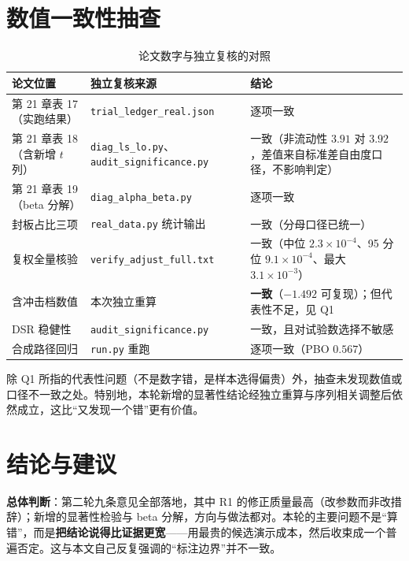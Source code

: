 \documentclass[11pt,a4paper]{ctexart}
\begin{document}
\section{数值一致性抽查}

\begin{table}[htbp]
\centering
\caption{论文数字与独立复核的对照}
\label{tab:consistency}
\begin{tabular}{@{}>{\raggedright\arraybackslash}p{4.6cm}>{\raggedright\arraybackslash}p{4.4cm}>{\raggedright\arraybackslash}p{4.6cm}@{}}
\toprule
论文位置 & 独立复核来源 & 结论 \\
\midrule
第 21 章表 17（实跑结果） & \texttt{trial\_ledger\_real.json} & 逐项一致 \\
第 21 章表 18（含新增 $t$ 列） & \texttt{diag\_ls\_lo.py}、\texttt{audit\_significance.py} & 一致（非流动性 $3.91$ 对 $3.92$，差值来自标准差自由度口径，不影响判定） \\
第 21 章表 19（beta 分解） & \texttt{diag\_alpha\_beta.py} & 逐项一致 \\
封板占比三项 & \texttt{real\_data.py} 统计输出 & 一致（分母口径已统一） \\
复权全量核验 & \texttt{verify\_adjust\_full.txt} & 一致（中位 $2.3\times10^{-4}$、95 分位 $9.1\times10^{-4}$、最大 $3.1\times10^{-3}$） \\
含冲击档数值 & 本次独立重算 & \textbf{一致}（$-1.492$ 可复现）；但代表性不足，见 Q1 \\
DSR 稳健性 & \texttt{audit\_significance.py} & 一致，且对试验数选择不敏感 \\
合成路径回归 & \texttt{run.py} 重跑 & 逐项一致（PBO $0.567$） \\
\bottomrule
\end{tabular}
\end{table}

除 Q1 所指的代表性问题（不是数字错，是样本选得偏贵）外，抽查未发现数值或口径不一致之处。特别地，本轮新增的显著性结论经独立重算与序列相关调整后依然成立，这比“又发现一个错”更有价值。

\section{结论与建议}

\textbf{总体判断}：第二轮九条意见全部落地，其中 R1 的修正质量最高（改参数而非改措辞）；新增的显著性检验与 beta 分解，方向与做法都对。本轮的主要问题不是“算错”，而是\textbf{把结论说得比证据更宽}——用最贵的候选演示成本，然后收束成一个普遍否定。这与本文自己反复强调的“标注边界”并不一致。
\end{document}
